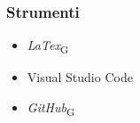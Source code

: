 \subsubsection{Strumenti}
\begin{itemize}
    \item \textit{LaTex}\textsubscript{G}
    \item Visual Studio Code
    \item \textit{GitHub}\textsubscript{G}
\end{itemize}
